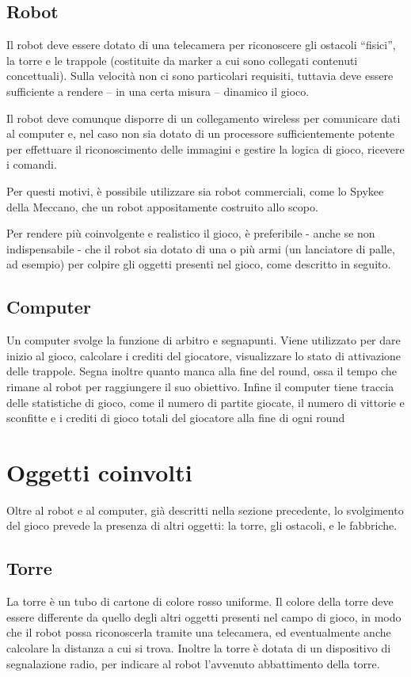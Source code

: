 \subsection*{Robot}
Il robot deve essere dotato di una telecamera per riconoscere gli ostacoli “fisici”, la torre e le trappole (costituite da marker a cui sono collegati contenuti concettuali). Sulla velocità non ci sono particolari requisiti, tuttavia deve essere sufficiente a rendere – in una certa misura – dinamico il gioco.

Il robot deve comunque disporre di un collegamento wireless per comunicare dati al computer e, nel caso non sia dotato di un processore sufficientemente potente per effettuare il riconoscimento delle immagini e gestire la logica di gioco, ricevere i comandi.

Per questi motivi, è possibile utilizzare sia robot commerciali, come lo Spykee della Meccano, che un robot appositamente costruito allo scopo.

Per rendere più coinvolgente e realistico il gioco, è preferibile - anche se non indispensabile - che il robot sia dotato di una o più armi (un lanciatore di palle, ad esempio) per colpire gli oggetti presenti nel gioco, come descritto in seguito.

\subsection*{Computer} Un computer svolge la funzione di arbitro e segnapunti. Viene utilizzato per dare inizio al gioco, calcolare i crediti del giocatore, visualizzare lo stato di attivazione delle trappole. Segna inoltre quanto manca alla fine del round, ossa il tempo che rimane al robot per raggiungere il suo obiettivo.
Infine il computer tiene traccia delle statistiche di gioco, come il numero di partite giocate, il numero di vittorie e sconfitte e i crediti di gioco totali del giocatore alla fine di ogni round

\section{Oggetti coinvolti}
Oltre al robot e al computer, già descritti nella sezione precedente, lo svolgimento del gioco prevede la presenza di altri oggetti: la torre, gli ostacoli, e le fabbriche.

\subsection*{Torre} La torre è un tubo di cartone di colore rosso uniforme. Il colore della torre deve essere differente da quello degli altri oggetti presenti nel campo di gioco, in modo che il robot possa riconoscerla tramite una telecamera, ed eventualmente anche calcolare la distanza a cui si trova. Inoltre la torre è dotata di un dispositivo di segnalazione radio, per indicare al robot l'avvenuto abbattimento della torre.

